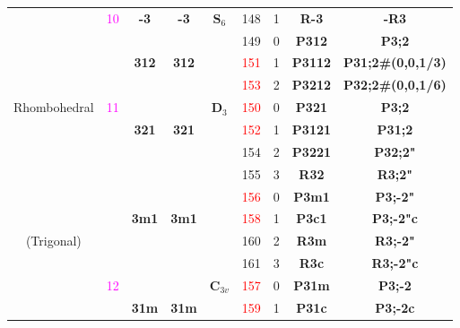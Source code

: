\documentclass{article}      %
\begin{document}
\begin{small}
\begin{longtable}[c]{|c|c|c|c|c|c|c|c|c|}
	  & \textrm{\textcolor{magenta}{10}} &\textbf{-3} &\textbf{-3} &$\mathbf{S}_6$  &\textrm{148}  &\textrm{1} &\textbf{R-3}         &\textbf{-R3}\\\cline{2-9}           
          &  & & & &\textrm{149}  &\textrm{0} &\textbf{P312}         &\textbf{P3;2}\\\cline{6-9}         
	  &  &\textbf{312} &\textbf{312} & &\textrm{\textcolor{red}{151}}  &\textrm{1} &\textbf{P3112}       &\textbf{P31;2#(0,0,1/3)}\\\cline{6-9}  
	  &  & & & &\textrm{\textcolor{red}{153}} & \textrm{2} &\textbf{P3212}       &\textbf{P32;2#(0,0,1/6)}\\\cline{3-4}\cline{6-9}  
\textrm{Rhombohedral}  & \textrm{\textcolor{magenta}{11}} & & &$\mathbf{D}_3$ &\textrm{\textcolor{red}{150}}  &\textrm{0} &\textbf{P321} &\textbf{P3;2}\\\cline{6-9}        
	  &  &\textbf{321} &\textbf{321} & &\textrm{\textcolor{red}{152}}  &\textrm{1} &\textbf{P3121}         &\textbf{P31;2}\\\cline{6-9}        
          &  & & & &\textrm{154}  &\textrm{2} &\textbf{P3221}       &\textbf{P32;2"}\\\cline{6-9}        
          &  & & & &\textrm{155} &\textrm{3} &\textbf{R32}         &\textbf{R3;2"}\\\cline{2-9}         
	  & & & & &\textrm{\textcolor{red}{156}} &\textrm{0} &\textbf{P3m1}         &\textbf{P3;-2"}\\\cline{6-9}       
&  &\textbf{3m1} &\textbf{3m1} & &\textrm{\textcolor{red}{158}} &\textrm{1} &\textbf{P3c1}         &\textbf{P3;-2"c}\\\cline{6-9}      
 \textrm{(Trigonal)} & & & & &\textrm{160} &\textrm{2} &\textbf{R3m}         &\textbf{R3;-2"}\\\cline{6-9}        
 &  & & & &\textrm{161} &\textrm{3} &\textbf{R3c}         &\textbf{R3;-2"c}\\\cline{3-4}\cline{6-9}       
& \textrm{\textcolor{magenta}{12}}  & & &$\mathbf{C}_{3v}$ &\textrm{\textcolor{red}{157}} &\textrm{0} &\textbf{P31m} &\textbf{P3;-2}\\\cline{6-9}        
&  &\textbf{31m} &\textbf{31m} & &\textrm{\textcolor{red}{159}} &\textrm{1} &\textbf{P31c}         &\textbf{P3;-2c}\\\cline{2-9}       

\end{longtable}
\end{small}
\end{document}

